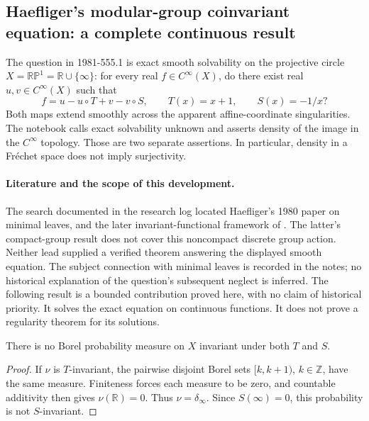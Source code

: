 \subsection{Haefliger's modular-group coinvariant equation: a complete continuous result}
\label{dev:1981-haefliger}

The question in 1981-555.1 is exact smooth solvability on the projective circle
\(X=\mathbb {RP}^{1}=\mathbb R\cup\{\infty\}\): for every real
\(f\in C^\infty(X)\), do there exist real \(u,v\in C^\infty(X)\) such that
\[
 f=u-u\circ T+v-v\circ S,
 \qquad T(x)=x+1,\qquad S(x)=-1/x?
\]
Both maps extend smoothly across the apparent affine-coordinate singularities.
The notebook calls exact solvability unknown and asserts density of the image
in the \(C^\infty\) topology. Those are two separate assertions. In particular,
density in a Fr\'echet space does not imply surjectivity.

\paragraph{Literature and the scope of this development.}
The search documented in the research log located Haefliger's 1980 paper on
minimal leaves, and the later invariant-functional framework of
\citet[abstract]{abouqatebelkacimi2000invariant}. The latter's
compact-group result does not cover this noncompact discrete group action.
Neither lead supplied a verified theorem answering the displayed smooth
equation. The subject connection with minimal leaves is recorded in the notes;
no historical explanation of the question's subsequent neglect is inferred.
The following result is a bounded contribution proved here, with no claim of
historical priority. It solves the exact equation on continuous functions. It
does not prove a regularity theorem for its solutions.

\begin{lemma}\ours
There is no Borel probability measure on \(X\) invariant under both \(T\)
and \(S\).
\end{lemma}
\begin{proof}
If \(\nu\) is \(T\)-invariant, the pairwise disjoint Borel sets
\([k,k+1)\), \(k\in\mathbb Z\), have the same measure. Finiteness forces
each measure to be zero, and countable additivity then gives
\(\nu(\mathbb R)=0\). Thus \(\nu=\delta_\infty\). Since
\(S(\infty)=0\), this probability is not \(S\)-invariant.
\end{proof}

